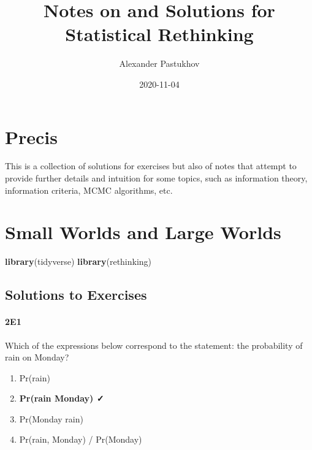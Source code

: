 \documentclass[
]{book}
\title{Notes on and Solutions for Statistical Rethinking}
\author{Alexander Pastukhov}
\date{2020-11-04}
\newenvironment{Shaded}{\begin{snugshade}}{\end{snugshade}}
\newcommand{\KeywordTok}[1]{\textcolor[rgb]{0.13,0.29,0.53}{\textbf{#1}}}
\newcommand{\NormalTok}[1]{#1}
\providecommand{\tightlist}{%
  \setlength{\itemsep}{0pt}\setlength{\parskip}{0pt}}
\begin{document}
\maketitle

{
\setcounter{tocdepth}{1}
\tableofcontents
}
\hypertarget{precis}{%
\chapter{Precis}\label{precis}}

This is a collection of solutions for exercises but also of notes that attempt to provide further details and intuition for some topics, such as information theory, information criteria, MCMC algorithms, etc.

\hypertarget{small-worlds-and-large-worlds}{%
\chapter{Small Worlds and Large Worlds}\label{small-worlds-and-large-worlds}}

\begin{Shaded}
\begin{Highlighting}[]
\KeywordTok{library}\NormalTok{(tidyverse)}
\KeywordTok{library}\NormalTok{(rethinking)}
\end{Highlighting}
\end{Shaded}

\hypertarget{solutions-to-exercises}{%
\section{Solutions to Exercises}\label{solutions-to-exercises}}

\hypertarget{e1}{%
\subsubsection*{2E1}\label{e1}}

Which of the expressions below correspond to the statement: the probability of rain on Monday?

\begin{enumerate}
\def\labelenumi{\arabic{enumi}.}
\tightlist
\item
  Pr(rain)
\item
  \textbf{Pr(rain \textbar{} Monday) ✓}
\item
  Pr(Monday \textbar{} rain)
\item
  Pr(rain, Monday) / Pr(Monday)
\end{enumerate}
\end{document}
